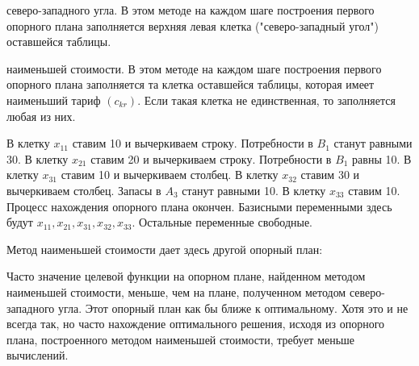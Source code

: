 { северо-западного угла}.  В этом методе на каждом шаге построения первого опорного плана заполняется верхняя левая клетка ("северо-западный угол") оставшейся таблицы.

{ наименьшей стоимости}. В этом методе на каждом шаге построения первого опорного плана заполняется та клетка оставшейся таблицы, которая имеет наименьший тариф $(c_{kr})$. Если такая клетка не единственная, то заполняется любая из них.


\begin{figure}[h]
\end{figure}

В клетку $x_{11}$ ставим  10 и вычеркиваем строку. Потребности в $B_1$ станут равными 30. В клетку $x_{21}$ ставим 20 и вычеркиваем  строку. Потребности в $B_1$ равны 10. В клетку $x_{31}$ ставим 10 и  вычеркиваем столбец. В клетку $x_{32}$ ставим 30 и  вычеркиваем столбец. Запасы в $A_3$  станут равными 10. В клетку $x_{33}$ ставим 10. Процесс  нахождения  опорного плана окончен. Базисными переменными здесь будут $x_{11}, x_{21}, x_{31}, x_{32}, x_{33}$. Остальные переменные свободные.

Метод наименьшей стоимости дает здесь другой опорный план:

\begin{figure}[h]
\end{figure}

Часто значение целевой функции на опорном плане, найденном методом наименьшей стоимости, меньше, чем на плане, полученном методом северо-западного угла. Этот опорный план как бы ближе к оптимальному. Хотя это и не всегда так, но часто нахождение оптимального решения, исходя из опорного плана, построенного методом наименьшей стоимости, требует меньше вычислений.
